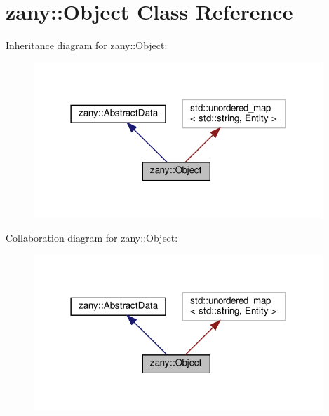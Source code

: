 \hypertarget{classzany_1_1_object}{}\section{zany\+:\+:Object Class Reference}
\label{classzany_1_1_object}


Inheritance diagram for zany\+:\+:Object\+:
\nopagebreak
\begin{figure}[H]
\begin{center}
\leavevmode
\includegraphics[width=310pt]{classzany_1_1_object__inherit__graph}
\end{center}
\end{figure}


Collaboration diagram for zany\+:\+:Object\+:
\nopagebreak
\begin{figure}[H]
\begin{center}
\leavevmode
\includegraphics[width=310pt]{classzany_1_1_object__coll__graph}
\end{center}
\end{figure}
